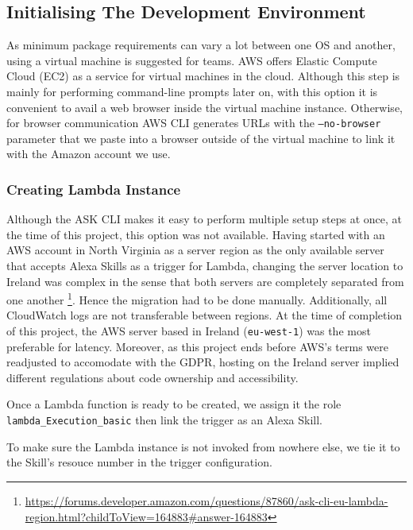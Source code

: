 \subsection*{Initialising The Development Environment}

As minimum package requirements can vary a lot between one OS and another, using a virtual machine is suggested for teams. AWS offers Elastic Compute Cloud (EC2) as a service for virtual machines in the cloud. Although this step is mainly for performing command-line prompts later on, %
with this option it is convenient to avail a web browser inside the virtual machine instance. Otherwise, for browser communication %
AWS CLI generates URLs with the \texttt{--no-browser} parameter that we %
paste into a browser outside of the virtual machine to link it with the Amazon account we use.


\subsubsection*{Creating Lambda Instance}

Although the ASK CLI makes it easy to perform multiple setup steps at once, at the time of this project, this option was not available. Having started with an AWS account in North Virginia as a server region as the only available server that accepts Alexa Skills as a trigger for Lambda, changing the server location to Ireland was complex in the sense that both servers are completely separated from one another \footnote{
\url{https://forums.developer.amazon.com/questions/87860/ask-cli-eu-lambda-region.html?childToView=164883\#answer-164883}}.
Hence the migration had to be done manually. Additionally, all CloudWatch logs are not transferable between regions. At the time of completion of this project, the AWS server based in Ireland (\texttt{eu-west-1}) %
was the most preferable for latency. Moreover, as this project ends before AWS's terms were readjusted to accomodate with the GDPR, hosting on the Ireland server implied different regulations about code ownership and accessibility.

Once a Lambda function is ready to be created, we assign it the role \texttt{lambda_Execution_basic} then link the trigger as an Alexa Skill.

To make sure the Lambda instance is not invoked from nowhere else, we tie it to the Skill's resouce number in the trigger configuration.

